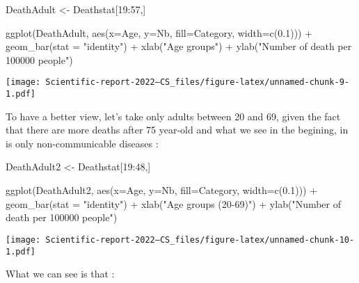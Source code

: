 \documentclass[
]{article}
\newenvironment{Shaded}{\begin{snugshade}}{\end{snugshade}}
\newcommand{\AttributeTok}[1]{\textcolor[rgb]{0.77,0.63,0.00}{#1}}
\newcommand{\DecValTok}[1]{\textcolor[rgb]{0.00,0.00,0.81}{#1}}
\newcommand{\FloatTok}[1]{\textcolor[rgb]{0.00,0.00,0.81}{#1}}
\newcommand{\FunctionTok}[1]{\textcolor[rgb]{0.00,0.00,0.00}{#1}}
\newcommand{\NormalTok}[1]{#1}
\newcommand{\OtherTok}[1]{\textcolor[rgb]{0.56,0.35,0.01}{#1}}
\newcommand{\SpecialCharTok}[1]{\textcolor[rgb]{0.00,0.00,0.00}{#1}}
\newcommand{\StringTok}[1]{\textcolor[rgb]{0.31,0.60,0.02}{#1}}
\begin{document}
\begin{Shaded}
\begin{Highlighting}[]
\NormalTok{DeathAdult }\OtherTok{\textless{}{-}}\NormalTok{ Deathstat[}\DecValTok{19}\SpecialCharTok{:}\DecValTok{57}\NormalTok{,]}

\FunctionTok{ggplot}\NormalTok{(DeathAdult, }\FunctionTok{aes}\NormalTok{(}\AttributeTok{x=}\NormalTok{Age, }\AttributeTok{y=}\NormalTok{Nb, }\AttributeTok{fill=}\NormalTok{Category, }\AttributeTok{width=}\FunctionTok{c}\NormalTok{(}\FloatTok{0.1}\NormalTok{))) }\SpecialCharTok{+}
  \FunctionTok{geom\_bar}\NormalTok{(}\AttributeTok{stat =} \StringTok{"identity"}\NormalTok{) }\SpecialCharTok{+}
  \FunctionTok{xlab}\NormalTok{(}\StringTok{"Age groups"}\NormalTok{) }\SpecialCharTok{+} 
  \FunctionTok{ylab}\NormalTok{(}\StringTok{"Number of death per 100\textquotesingle{}000 people"}\NormalTok{)}
\end{Highlighting}
\end{Shaded}

\texttt{[image: Scientific-report-2022---CS\_files/figure-latex/unnamed-chunk-9-1.pdf]}

To have a better view, let's take only adults between 20 and 69, given
the fact that there are more deaths after 75 year-old and what we see in
the begining, in is only non-communicable diseases :

\begin{Shaded}
\begin{Highlighting}[]
\NormalTok{DeathAdult2 }\OtherTok{\textless{}{-}}\NormalTok{ Deathstat[}\DecValTok{19}\SpecialCharTok{:}\DecValTok{48}\NormalTok{,]}

\FunctionTok{ggplot}\NormalTok{(DeathAdult2, }\FunctionTok{aes}\NormalTok{(}\AttributeTok{x=}\NormalTok{Age, }\AttributeTok{y=}\NormalTok{Nb, }\AttributeTok{fill=}\NormalTok{Category, }\AttributeTok{width=}\FunctionTok{c}\NormalTok{(}\FloatTok{0.1}\NormalTok{))) }\SpecialCharTok{+}
  \FunctionTok{geom\_bar}\NormalTok{(}\AttributeTok{stat =} \StringTok{"identity"}\NormalTok{) }\SpecialCharTok{+}
  \FunctionTok{xlab}\NormalTok{(}\StringTok{"Age groups (20{-}69)"}\NormalTok{) }\SpecialCharTok{+} 
  \FunctionTok{ylab}\NormalTok{(}\StringTok{"Number of death per 100\textquotesingle{}000 people"}\NormalTok{)}
\end{Highlighting}
\end{Shaded}

\texttt{[image: Scientific-report-2022---CS\_files/figure-latex/unnamed-chunk-10-1.pdf]}

What we can see is that :
\end{document}
